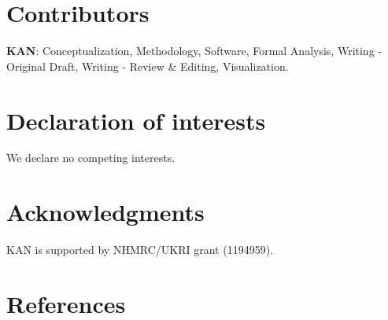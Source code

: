 \documentclass[preprint,12pt]{elsarticle}
\begin{document}





\section*{Contributors}\label{sec:credit}
\textbf{KAN}: Conceptualization, Methodology, Software, Formal Analysis, Writing - Original Draft, Writing - Review \& Editing, Visualization.

\section*{Declaration of interests}\label{sec:dec}
We declare no competing interests.

\section*{Acknowledgments}\label{sec:ak}
KAN is supported by NHMRC/UKRI grant (1194959).





%


\section*{References}\label{sec:ref}

\end{document}
